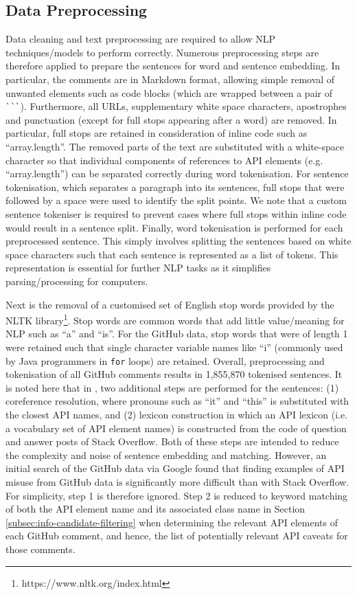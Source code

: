 \subsection{Data Preprocessing}
\label{subsec:info-data-preprocess}
Data cleaning and text preprocessing are required to allow NLP techniques/models to perform correctly. Numerous preprocessing steps are therefore applied to prepare the sentences for word and sentence embedding. In particular, the comments are in Markdown format, allowing simple removal of unwanted elements such as code blocks (which are wrapped between a pair of \lstinline{```}). Furthermore, all URLs, supplementary white space characters, apostrophes and punctuation (except for full stops appearing after a word) are removed. In particular, full stops are retained in consideration of inline code such as ``array.length''. The removed parts of the text are substituted with a white-space character so that individual components of references to API elements (e.g. ``array.length'') can be separated correctly during word tokenisation.  For sentence tokenisation, which separates a paragraph into its sentences, full stops that were followed by a space were used to identify the split points.  We note that a custom sentence tokeniser is required to prevent cases where full stops within inline code would result in a sentence split. Finally, word tokenisation is performed for each preprocessed sentence. This simply involves splitting the sentences based on white space characters such that each sentence is represented as a list of tokens. This representation is essential for further NLP tasks as it simplifies parsing/processing for computers. \bigbreak

Next is the removal of a customised set of English stop words provided by the NLTK library\footnote{https://www.nltk.org/index.html}. Stop words are common words that add little value/meaning for NLP such as ``a'' and ``is''. For the GitHub data, stop words that were of length 1 were retained such that single character variable names like ``i'' (commonly used by Java programmers in \lstinline{for} loops) are retained. Overall, preprocessing and tokenisation of all GitHub comments results in 1,855,870 tokenised sentences. It is noted here that in \cite{jiamou}, two additional steps are performed for the sentences: (1) coreference resolution, where pronouns such as ``it'' and ``this'' is substituted with the closest API names, and (2) lexicon construction in which an API lexicon (i.e. a vocabulary set of API element names) is constructed from the code of question and answer posts of Stack Overflow. Both of these steps are intended to reduce the complexity and noise of sentence embedding and matching. However, an initial search of the GitHub data via Google found that finding examples of API misuse from GitHub data is significantly more difficult than with Stack Overflow. For simplicity, step 1 is therefore ignored. Step 2 is reduced to keyword matching of both the API element name and its associated class name in Section \ref{subsec:info-candidate-filtering} when determining the relevant API elements of each GitHub comment, and hence, the list of potentially relevant API caveats for those comments.


